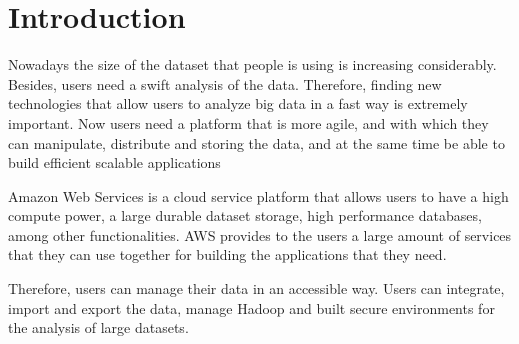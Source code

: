 
\label{sec:introduction}
\section{Introduction}

Nowadays the size of the dataset that people is using is increasing considerably. Besides, users need a swift analysis of the data. Therefore, finding new technologies that allow users to analyze big data in a fast way is extremely important. Now users need a platform that is more agile, and with which they can manipulate, distribute and storing the data, and at the same time be able to build efficient scalable applications

Amazon Web Services is a cloud service platform that allows users to have a high compute power, a large durable dataset storage, high performance databases, among other functionalities. AWS provides to the users a large amount of services that they can use together for building the applications that they need.

Therefore, users can manage their data in an accessible way. Users can integrate, import and export the data, manage Hadoop and built secure environments for the analysis of large datasets.   
